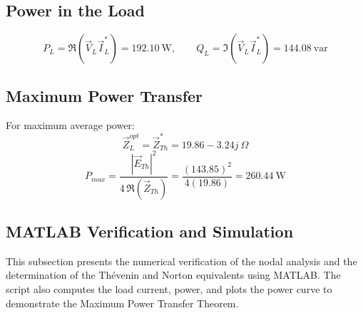 \documentclass[a4paper,12pt]{article}
\begin{document}
\subsection*{Power in the Load}
\[
P_L = \Re(\vec V_L \vec I_L^*) = 192.10~\text{W}, \qquad 
Q_L = \Im(\vec V_L \vec I_L^*) = 144.08~\text{var}
\]

\subsection*{Maximum Power Transfer}
For maximum average power:
\[
\boxed{\vec Z_L^{opt} = \vec Z_{Th}^* = 19.86 - 3.24j~\Omega}
\]
\[
\boxed{P_{max} = \frac{|\vec E_{Th}|^2}{4\,\Re(\vec Z_{Th})}
= \frac{(143.85)^2}{4(19.86)} = 260.44~\text{W}}
\]




\subsection{MATLAB Verification and Simulation}

This subsection presents the numerical verification of the nodal analysis and 
the determination of the Thévenin and Norton equivalents using MATLAB.  
The script also computes the load current, power, and plots the power curve 
to demonstrate the Maximum Power Transfer Theorem.
\end{document}
